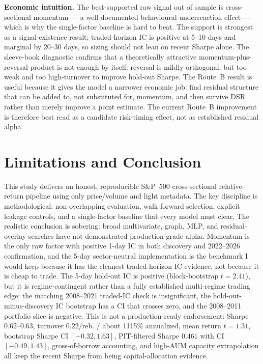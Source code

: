 \documentclass[9pt]{extarticle}
\begin{document}
\textbf{Economic intuition.} The best-supported raw signal out of sample is
cross-sectional momentum --- a well-documented behavioural underreaction effect
--- which is why the single-factor baseline is hard to beat. The support is
strongest as a signal-existence result; traded-horizon IC is positive at 5--10
days and marginal by 20--30 days, so sizing should not lean on recent Sharpe
alone.
The sleeve-book diagnostic confirms that a theoretically attractive
momentum-plus-reversal product is not enough by itself: reversal is mildly
orthogonal, but too weak and too high-turnover to improve hold-out Sharpe. The
Route~B result is useful because it gives the model a narrower economic job:
find residual structure that can be added to, not substituted for, momentum, and
then survive DSR rather than merely improve a point estimate. The current
Route~B improvement is therefore best read as a candidate risk-timing effect,
not as established residual alpha.

\section{Limitations and Conclusion}

This study delivers an honest, reproducible S\&P~500 cross-sectional
relative-return pipeline using only price/volume and light metadata. The key
discipline is methodological: non-overlapping evaluation, walk-forward
selection, explicit leakage controls, and a single-factor baseline that every
model must clear. The realistic conclusion is sobering: broad multivariate,
graph, MLP, and residual-overlay searches have not demonstrated production-grade
alpha. Momentum is the only raw factor with positive 1-day IC in both discovery
and 2022--2026 confirmation, and the 5-day sector-neutral
implementation is the benchmark I would keep because it has the cleanest
traded-horizon IC evidence, not because it is cheap to trade. The 5-day
hold-out IC is positive (block-bootstrap $t=2.41$), but it is regime-contingent rather than a
fully established multi-regime trading edge: the matching 2008--2021 traded-IC
check is insignificant, the hold-out-minus-discovery IC bootstrap has a CI that
crosses zero, and the 2008--2011 portfolio slice is negative. This is
not a production-ready endorsement: Sharpe $0.62$--$0.63$, turnover $0.22$/reb.
/ about 1115\% annualized, mean return $t=1.31$, bootstrap Sharpe CI
$[-0.32,1.63]$, PIT-filtered Sharpe $0.461$ with CI $[-0.49,1.43]$,
gross-of-borrow accounting, and high-AUM capacity extrapolation all keep the
recent Sharpe from being capital-allocation evidence.
\end{document}
